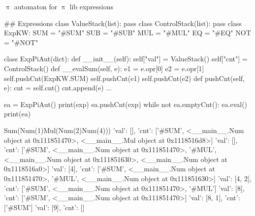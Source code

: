 \documentclass{beamer}
\begin{document}

\begin{frame}{{\color{red}$\uppi$ automaton} for {\color{red}$\uppi$ lib} expressions}

\begin{python}
## Expressions
class ValueStack(list): pass
class ControlStack(list): pass
class ExpKW:
    SUM = "#SUM"
    SUB = "#SUB"
    MUL = "#MUL"
    EQ = "#EQ"
    NOT = "#NOT"
\end{python}

\framebreak    

\begin{python}    
class ExpPiAut(dict):
    def __init__(self):    
        self["val"] = ValueStack()
        self["cnt"] = ControlStack()
    def __evalSum(self, e):
        e1 = e.opr[0]
        e2 = e.opr[1]
        self.pushCnt(ExpKW.SUM)
        self.pushCnt(e1)
        self.pushCnt(e2)
    def pushCnt(self, e):
        cnt = self.cnt()
        cnt.append(e)
$\ldots$
\end{python}

\framebreak

\begin{python}    
ea = ExpPiAut()
print(exp)
ea.pushCnt(exp)
while not ea.emptyCnt():
    ea.eval()
    print(ea)
\end{python}

\framebreak

\begin{adjustbox}{width=2\textwidth}
\begin{python}    
Sum(Num(1)Mul(Num(2)Num(4)))
{'val': [], 'cnt': ['#SUM', <__main__.Num object at 0x111851470>, <__main__.Mul object at 0x1118516d8>]}
{'val': [], 'cnt': ['#SUM', <__main__.Num object at 0x111851470>, '#MUL', <__main__.Num object at 0x111851630>, <__main__.Num object at 0x1118516a0>]}
{'val': [4], 'cnt': ['#SUM', <__main__.Num object at 0x111851470>, '#MUL', <__main__.Num object at 0x111851630>]}
{'val': [4, 2], 'cnt': ['#SUM', <__main__.Num object at 0x111851470>, '#MUL']}
{'val': [8], 'cnt': ['#SUM', <__main__.Num object at 0x111851470>]}
{'val': [8, 1], 'cnt': ['#SUM']}
{'val': [9], 'cnt': []}
\end{python}
\end{adjustbox}

\end{frame}

\end{document}
